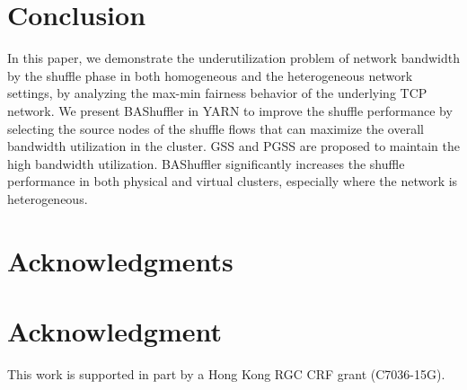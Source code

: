 \documentclass[10pt,journal,compsoc]{IEEEtran}
\begin{document}
\section{Conclusion}\label{section:conclusion}
In this paper, we demonstrate the underutilization problem of network
bandwidth by the shuffle phase in both homogeneous and the heterogeneous
network settings, by analyzing the max-min fairness behavior of the
underlying TCP network.
We present BAShuffler in YARN to improve the shuffle performance by
selecting the source nodes of the shuffle flows that can
maximize the overall bandwidth utilization in the cluster. 
GSS and PGSS are proposed to maintain the high bandwidth utilization. 
BAShuffler significantly increases the shuffle performance in both
physical and virtual clusters, especially where the network is
heterogeneous.


\ifCLASSOPTIONcompsoc
 \section*{Acknowledgments}
\else
 \section*{Acknowledgment}
\fi
This work is supported in part by a Hong Kong RGC CRF grant
(C7036-15G).


%
%
\end{document}

